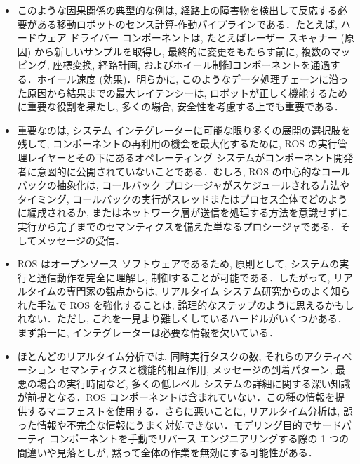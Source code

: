 \begin{frame}{}
\begin{itemize}
\item このような因果関係の典型的な例は, 経路上の障害物を検出して反応する必要がある移動ロボットのセンス計算-作動パイプラインである．たとえば, ハードウェア ドライバー コンポーネントは, たとえばレーザー スキャナー (原因) から新しいサンプルを取得し, 最終的に変更をもたらす前に, 複数のマッピング, 座標変換, 経路計画, およびホイール制御コンポーネントを通過する．ホイール速度 (効果)．明らかに, このようなデータ処理チェーンに沿った原因から結果までの最大レイテンシーは, ロボットが正しく機能するために重要な役割を果たし, 多くの場合, 安全性を考慮する上でも重要である．
\end{itemize}
\end{frame}

\begin{frame}{}
\begin{itemize}
\item 重要なのは, システム インテグレーターに可能な限り多くの展開の選択肢を残して, コンポーネントの再利用の機会を最大化するために, ROS の実行管理レイヤーとその下にあるオペレーティング システムがコンポーネント開発者に意図的に公開されていないことである．むしろ, ROS の中心的なコールバックの抽象化は, コールバック プロシージャがスケジュールされる方法やタイミング, コールバックの実行がスレッドまたはプロセス全体でどのように編成されるか, またはネットワーク層が送信を処理する方法を意識せずに, 実行から完了までのセマンティクスを備えた単なるプロシージャである．そしてメッセージの受信．
\end{itemize}
\end{frame}

\begin{frame}{}
\begin{itemize}
\item ROS はオープンソース ソフトウェアであるため, 原則として, システムの実行と通信動作を完全に理解し, 制御することが可能である．したがって, リアルタイムの専門家の観点からは, リアルタイム システム研究からのよく知られた手法で ROS を強化することは, 論理的なステップのように思えるかもしれない．ただし, これを一見より難しくしているハードルがいくつかある．まず第一に, インテグレーターは必要な情報を欠いている．
\end{itemize}
\end{frame}

\begin{frame}{}
\begin{itemize}
\item ほとんどのリアルタイム分析では, 同時実行タスクの数, それらのアクティベーション セマンティクスと機能的相互作用, メッセージの到着パターン, 最悪の場合の実行時間など, 多くの低レベル システムの詳細に関する深い知識が前提となる．ROS コンポーネントは含まれていない．この種の情報を提供するマニフェストを使用する．さらに悪いことに, リアルタイム分析は, 誤った情報や不完全な情報にうまく対処できない．モデリング目的でサードパーティ コンポーネントを手動でリバース エンジニアリングする際の 1 つの間違いや見落としが, 黙って全体の作業を無効にする可能性がある．
\end{itemize}
\end{frame}

